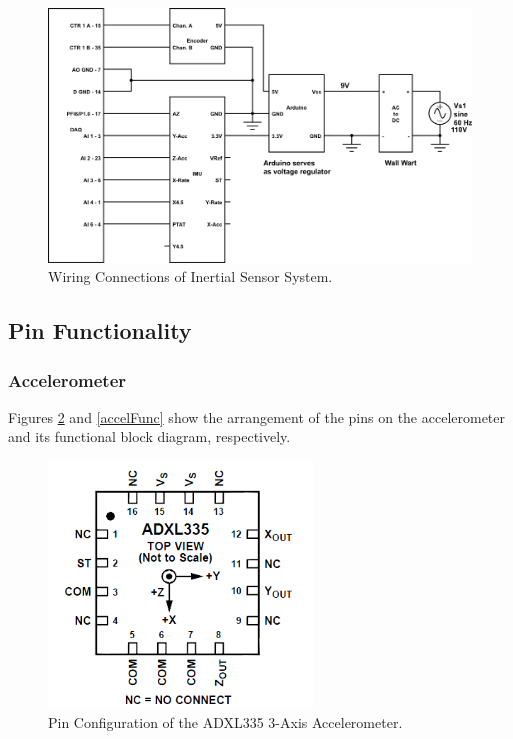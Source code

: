 \documentclass{article}
\theoremstyle{plain}
\theoremstyle{definition}
\theoremstyle{remark}
\begin{document}
\begin{figure}[hbt]
\begin{center}
\includegraphics[width = 16cm]{WiringDiagram.png}
\caption{Wiring Connections of Inertial Sensor System.}
\label{wiring}
\end{center}
\end{figure}

\clearpage

\subsection{Pin Functionality}

\subsubsection{Accelerometer}
Figures \ref{accelPins} and \ref{accelFunc} show the arrangement of the pins on the accelerometer and its functional block diagram, respectively. \\

\begin{figure}[hbt]
\begin{center}
\includegraphics[width = 7cm]{ADXL335Pins.png}
\caption{Pin Configuration of the ADXL335 3-Axis Accelerometer.}
\label{accelPins}
\end{center}
\end{figure}
\end{document}

